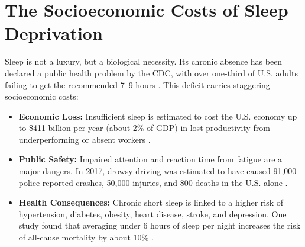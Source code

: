 \section{The Socioeconomic Costs of Sleep Deprivation}\label{sec:socioeconomic_costs}

Sleep is not a luxury, but a biological necessity. Its chronic absence has been declared a public health problem by the CDC, with over one-third of U.S. adults failing to get the recommended 7--9 hours \citep{cdc2016shortsleep}. This deficit carries staggering socioeconomic costs:

\begin{itemize}
    \item \textbf{Economic Loss:} Insufficient sleep is estimated to cost the U.S. economy up to \$411 billion per year (about 2\% of GDP) in lost productivity from underperforming or absent workers \citep{rand2016cost}.
    \item \textbf{Public Safety:} Impaired attention and reaction time from fatigue are a major dangers. In 2017, drowsy driving was estimated to have caused 91,000 police-reported crashes, 50,000 injuries, and 800 deaths in the U.S. alone \citep{nhtsa2017drowsy}.
    \item \textbf{Health Consequences:} Chronic short sleep is linked to a higher risk of hypertension, diabetes, obesity, heart disease, stroke, and depression. One study found that averaging under 6 hours of sleep per night increases the risk of all-cause mortality by about 10\% \citep{cdc2016shortsleep}.
\end{itemize}